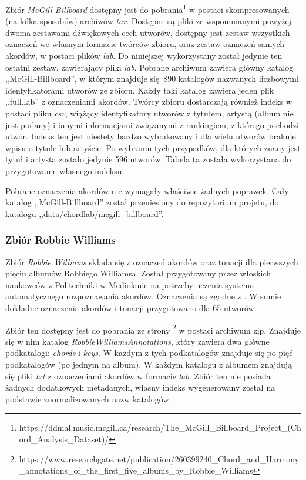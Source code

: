 Zbiór \emph{McGill Billboard} dostępny jest do
pobrania\footnote{https://ddmal.music.mcgill.ca/research/The\_McGill\_Billboard\_Project\_(Chord\_Analysis\_Dataset)/}
w postaci skompresowanych (na kilka sposobów) archiwów \emph{tar}. Dostępne są pliki ze wspomnianymi
powyżej dwoma zestawami dźwiękowych cech utworów, dostępny jest zestaw wszystkich oznaczeń we
własnym formacie twórców zbioru, oraz zestaw oznaczeń samych akordów, w postaci plików \emph{lab}.
Do niniejszej wykorzystany został jedynie ten ostatni zestaw, zawierający pliki \emph{lab}. Pobrane
archiwum zawiera główny katalog ,,McGill-Billboard'', w którym znajduje się 890 katalogów nazwanych
liczbowymi identyfikatorami utworów ze zbioru. Każdy taki katalog zawiera jeden plik ,,full.lab'' z
oznaczeniami akordów. Twórcy zbioru dostarczają również indeks w postaci pliku \emph{csv}, wiążący
identyfikatory utworów z tytułem, artystą (album nie jest podany) i innymi informacjami związanymi z
rankingiem, z którego pochodzi utwór. Indeks ten jest niestety bardzo wybrakowany i dla wielu
utworów brakuje wpisu o tytule lub artyście. Po wybraniu tych przypadków, dla których znany jest
tytuł i artysta zostało jedynie 596 utworów. Tabela ta została wykorzystana do przygotowanie
własnego indeksu.

Pobrane oznaczenia akordów nie wymagały właściwie żadnych poprawek. Cały katalog
,,McGill-Billboard'' został przeniesiony do repozytorium projetu, do katalogu
,,data/chordlab/mcgill\_billboard''.

\subsubsection{Zbiór Robbie Williams}

Zbiór \emph{Robbie Williams} \cite{giorgi_automatic_2013} składa się z oznaczeń akordów oraz tonacji
dla pierwszych pięciu albumów Robbiego Williamsa. Został przygotowany przez włoskich naukowców z
Politechniki w Mediolanie na potrzeby uczenia systemu automatycznego rozpoznawania akordów.
Oznaczenia są zgodne z \cite{harte_towards_nodate}. W sumie dokładne oznaczenia akordów i tonacji
przygotowano dla 65 utworów.

Zbiór ten dostępny jest do pobrania ze strony
\footnote{https://www.researchgate.net/publication/260399240_Chord_and_Harmony_annotations_of_the_first_five_albums_by_Robbie_Williams}
w postaci archiwum zip. Znajduje się w nim katalog \emph{RobbieWilliamsAnnotations}, który zawiera
dwa główne podkatalogi: \emph{chords} i \emph{keys}. W każdym z tych podkatalogów znajduje się po pięć
podkatalogów (po jednym na album). W każdym katalogu z albumem znajdują się pliki \emph{txt} z
oznaczeniami akordów w formacie \emph{lab}. Zbiór ten nie posiada żadnych dodatkowych metadanych,
własny indeks wygenerowany został na podstawie znormalizowanych nazw katalogów.

